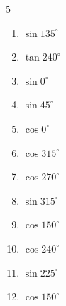 \begin{multicols}{5}
\begin{enumerate}

  \item $\displaystyle \sin{135^\circ}$


  \item $\displaystyle \tan{240^\circ}$


  \item $\displaystyle \sin{0^\circ}$

        \phantom{$\displaystyle =0$}

  \item $\displaystyle \sin{45^\circ}$


\columnbreak %

  \item $\displaystyle \cos{0^\circ}$

        \phantom{$\displaystyle =1$}

  \item $\displaystyle \cos{315^\circ}$


  \item $\displaystyle \cos{270^\circ}$

        \phantom{$\displaystyle =0$}

  \item $\displaystyle \sin{315^\circ}$


  \item $\displaystyle \cos{150^\circ}$


  \item $\displaystyle \cos{240^\circ}$


  \item $\displaystyle \sin{225^\circ}$


  \item $\displaystyle \cos{150^\circ}$



\end{enumerate}
\end{multicols}

